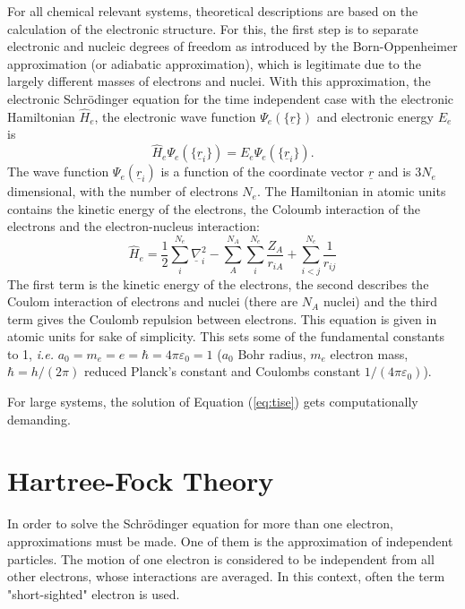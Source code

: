 \documentclass[11pt,DIV=13,BCOR=5mm,a4paper,headinclude]{scrbook}
\renewcommand{\vec}[1]{\underline{#1}}
\begin{document}
For all chemical relevant systems, theoretical descriptions are based on the calculation of the electronic structure.
For this, the first step is to separate electronic and nucleic degrees of freedom as introduced by the Born-Oppenheimer approximation\cite{bornoppenheimer} (or adiabatic approximation), which is legitimate due to the largely different masses of electrons and nuclei.
With this approximation, the electronic Schrödinger equation for the time independent case  with the electronic Hamiltonian $\hat{H}_e$, the electronic wave function $\Psi_e(\{\vec{r}\})$ and electronic energy $E_e$ is
\begin{equation}\label{eq:tise}
 \hat{H}_e\Psi_e(\{\vec{r}_i\})=E_e\Psi_e(\{\vec{r}_i\}).
\end{equation}
The wave function $\Psi_e(\vec{r}_i)$ is a function of the coordinate vector $\vec{r}$ and is 3$N_e$ dimensional, with the number of electrons $N_e$.
The Hamiltonian in atomic units contains the kinetic energy of the electrons, the Coloumb interaction of the electrons and the electron-nucleus interaction:
\begin{equation}
 \hat{H}_e= \frac{1}{2}\sum_i^{N_e}\vec{\nabla}_i^2 - \sum_A^{N_A}\sum_i^{N_e}\frac{Z_A}{r_{iA}} + \sum_{i<j}^{N_e}\frac{1}{r_{ij}}
\end{equation}
The first term is the kinetic energy of the electrons, the second describes the Coulom interaction of electrons and nuclei (there are $N_A$ nuclei) and the third term gives the Coulomb repulsion between electrons.
This equation is given in atomic units for sake of simplicity.
This sets some of the fundamental constants to 1, \textit{i.e.} $a_0=m_e=e=\hbar=4\pi\varepsilon_0=1$ ($a_0$ Bohr radius, $m_e$ electron mass, $\hbar=h/(2\pi)$ reduced Planck's constant and Coulombs constant $1/(4\pi\varepsilon_0)$).

For large systems, %
the solution of Equation (\ref{eq:tise}) gets computationally demanding.

\section{Hartree-Fock Theory}
In order to solve the Schr\"{o}dinger equation for more than one electron, approximations must be made\cite{szabo}.
One of them is the approximation of independent particles.
The motion of one electron is considered to be independent from all other electrons, whose interactions are averaged.
In this context, often the term "short-sighted" electron is used.
\end{document}
